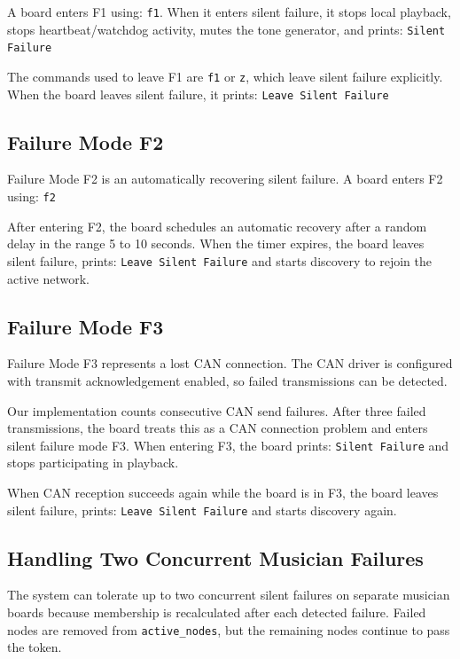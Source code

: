 \documentclass[11pt,a4paper]{article}
\begin{document}
A board enters F1 using: \texttt{f1}. When it enters silent failure, it stops local playback, stops heartbeat/watchdog activity, mutes the tone generator, and prints: \texttt{Silent Failure}

The commands used to leave F1 are \texttt{f1} or \texttt{z}, which leave silent failure explicitly. When the board leaves silent failure, it prints: \texttt{Leave Silent Failure}

\subsection*{Failure Mode F2}

Failure Mode F2 is an automatically recovering silent failure. A board enters F2 using: \texttt{f2}

After entering F2, the board schedules an automatic recovery after a random delay in the range 5 to 10 seconds. When the timer expires, the board leaves silent failure, prints: \texttt{Leave Silent Failure} and starts discovery to rejoin the active network.

\subsection*{Failure Mode F3}

Failure Mode F3 represents a lost CAN connection. The CAN driver is configured with transmit acknowledgement enabled, so failed transmissions can be detected.

Our implementation counts consecutive CAN send failures. After three failed transmissions, the board treats this as a CAN connection problem and enters silent failure mode F3. When entering F3, the board prints: \texttt{Silent Failure} and stops participating in playback.

When CAN reception succeeds again while the board is in F3, the board leaves silent failure, prints: \texttt{Leave Silent Failure} and starts discovery again.

\subsection*{Handling Two Concurrent Musician Failures}

The system can tolerate up to two concurrent silent failures on separate musician boards because membership is recalculated after each detected failure. Failed nodes are removed from \texttt{active\_\allowbreak{}nodes}, but the remaining nodes continue to pass the token.
\end{document}
